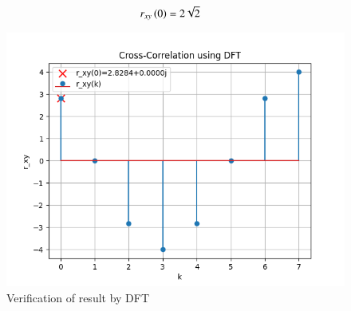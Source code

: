\documentclass[journal,12pt,twocolumn]{IEEEtran}
\theoremstyle{remark}
\begin{document}
\begin{align}
    r_{xy}\left(0\right) &= 2\sqrt{2}
\end{align}
\begin{figure}[H]
    \includegraphics[width=1\columnwidth]{figs/cross-corelation.png}
    \caption{Verification of result by DFT}
    \label{fig:cross-corelation}
\end{figure}
\end{document}
